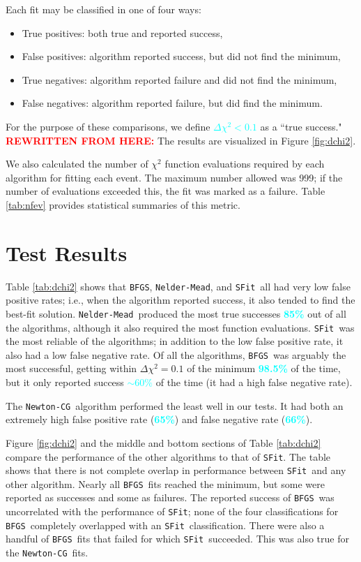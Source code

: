 \documentclass[preprint]{aastex631}
\newcommand{\HL}[1]{\textcolor{red}{\bf#1}}
\newcommand{\num}[1]{\textcolor{cyan}{\bf#1}}
\newcommand{\neldarmead}{\texttt{Nelder-Mead}}
\newcommand{\newtoncg}{\texttt{Newton-CG}}
\newcommand{\bfgs}{\texttt{BFGS}}
\newcommand{\sfit}{\texttt{SFit}}
\begin{document}
Each fit may be classified in one of four ways:
\begin{itemize}
\item{True positives: both true and reported success,}
\item{False positives: algorithm reported success, but did not find the minimum,}
\item{True negatives: algorithm reported failure and did not find the minimum,}
\item{False negatives: algorithm reported failure, but did find the minimum.}
\end{itemize}
For the purpose of these comparisons, we define \num{$\Delta\chi^2 < 0.1$} as a ``true success." \HL{REWRITTEN FROM HERE:} The results are visualized in Figure \ref{fig:dchi2}.

We also calculated the number of $\chi^2$ function evaluations required by each algorithm for fitting each event. The maximum  number allowed was 999; if the number of evaluations exceeded this, the fit was marked as a failure. Table \ref{tab:nfev} provides statistical summaries of this metric.

\section{Test Results}

Table \ref{tab:dchi2} shows that \bfgs, \neldarmead, and \sfit\, all had very low false positive rates; i.e., when the algorithm reported success, it also tended to find the best-fit solution. \neldarmead\, produced the most true successes \num{85\%} out of all the algorithms, although it also required the most function evaluations. \sfit\, was the most reliable of the algorithms; in addition to the low false positive rate, it also had a low false negative rate. Of all the algorithms, \bfgs\, was arguably the most successful, getting within $\Delta\chi^2=0.1$ of the minimum \num{98.5\%} of the time, but it only reported success \num{$\sim60\%$} of the time (it had a high false negative rate). 

The \newtoncg\, algorithm performed the least well in our tests. It had both an extremely high false positive rate (\num{65\%}) and false negative rate (\num{66\%}).

Figure \ref{fig:dchi2} and the middle and bottom sections of Table \ref{tab:dchi2} compare the performance of the other algorithms to that of \sfit. The table shows that there is not complete overlap in performance between \sfit\, and any other algorithm. Nearly all \bfgs\, fits reached the minimum, but some were reported as successes and some as failures. The reported success of \bfgs\, was uncorrelated with the performance of \sfit; none of the four classifications for \bfgs\, completely overlapped with an \sfit\, classification. There were also a handful of \bfgs\, fits that failed for which \sfit\, succeeded. This was also true for the \newtoncg\, fits.
\end{document}
